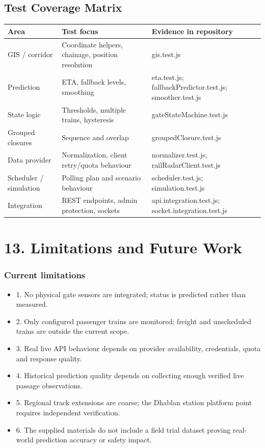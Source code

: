 \documentclass[12pt,a4paper]{report}
\begin{document}
\section{Test Coverage Matrix}
\begin{longtable}{p{}p{}p{}}
\toprule Area & Test focus & Evidence in repository\\
\midrule
GIS / corridor & Coordinate helpers, chainage, position resolution & gis.test.js\\
Prediction & ETA, fallback levels, smoothing & eta.test.js; fallbackPredictor.test.js; smoother.test.js\\
State logic & Thresholds, multiple trains, hysteresis & gateStateMachine.test.js\\
Grouped closures & Sequence and overlap & groupedClosure.test.js\\
Data provider & Normalization, client retry/quota behaviour & normalizer.test.js; railRadarClient.test.js\\
Scheduler / simulation & Polling plan and scenario behaviour & scheduler.test.js; simulation.test.js\\
Integration & REST endpoints, admin protection, sockets & api.integration.test.js; socket.integration.test.js\\
\bottomrule
\end{longtable}
\chapter{13. Limitations and Future Work}
\subsection{Current limitations}
\begin{itemize}\item 1. No physical gate sensors are integrated; status is predicted rather than measured.\end{itemize}
\begin{itemize}\item 2. Only configured passenger trains are monitored; freight and unscheduled trains are outside the current scope.\end{itemize}
\begin{itemize}\item 3. Real live API behaviour depends on provider availability, credentials, quota and response quality.\end{itemize}
\begin{itemize}\item 4. Historical prediction quality depends on collecting enough verified live passage observations.\end{itemize}
\begin{itemize}\item 5. Regional track extensions are coarse; the Dhablan station platform point requires independent verification.\end{itemize}
\begin{itemize}\item 6. The supplied materials do not include a field trial dataset proving real-world prediction accuracy or safety impact.\end{itemize}
\end{document}
